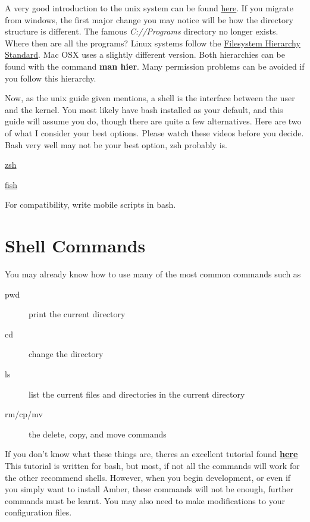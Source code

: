 \documentclass{article}
\begin{document}
A very good introduction to the unix system can be found \href{http://linuxcommand.org/lc3\_learning\_the\_shell.php}{here}.
If you migrate from windows, the first major change you may notice will be how the directory structure is different.
The famous \textit{C://Programs} directory no longer exists.
Where then are all the programs?
Linux systems follow the \href{https://en.wikipedia.org/wiki/Filesystem\_Hierarchy\_Standard}{Filesystem Hierarchy Standard}.
Mac OSX uses a slightly different version.
Both hierarchies can be found with the command \textbf{man hier}.
Many permission problems can be avoided if you follow this hierarchy.

Now, as the unix guide given mentions, a shell is the interface between the user and the kernel.
You most likely have bash installed as your default, and this guide will assume you do, though there are quite a few alternatives.
Here are two of what I consider your best options.
Please watch these videos before you decide.
Bash very well may not be your best option, zsh probably is.
\begin{description}
  \item \href{https://www.youtube.com/watch?v=1S3MUVIAieE}{zsh}
  \item \href{https://www.youtube.com/watch?v=SWmKfb2jQhU}{fish}
\end{description}
For compatibility, write mobile scripts in bash.

\section*{Shell Commands}

You may already know how to use many of the most common commands such as
\begin{description}
  \item[pwd] print the current directory
  \item[cd] change the directory
  \item[ls] list the current files and directories in the current directory
  \item[rm/cp/mv] the delete, copy, and move commands
\end{description}
If you don't know what these things are, theres an excellent tutorial found \href{http://linuxcommand.org/lc3\_learning\_the\_shell.php}{\textbf{here}}
This tutorial is written for bash, but most, if not all the commands will work for the other recommend shells.
However, when you begin development, or even if you simply want to install Amber, these commands will not be enough, further commands must be learnt. 
You may also need to make modifications to your configuration files.
\end{document}
